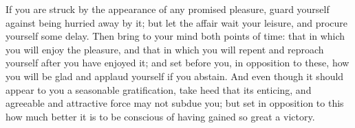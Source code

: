 If you are struck by the appearance of any promised pleasure,
guard yourself against being hurried away by it; but let the affair
wait your leisure, and procure yourself some delay. Then bring to
your mind both points of time: that in which you will enjoy the pleasure,
and that in which you will repent and reproach yourself after you
have enjoyed it; and set before you, in opposition to these, how you
will be glad and applaud yourself if you abstain. And even though
it should appear to you a seasonable gratification, take heed that
its enticing, and agreeable and attractive force may not subdue you;
but set in opposition to this how much better it is to be conscious
of having gained so great a victory. 
